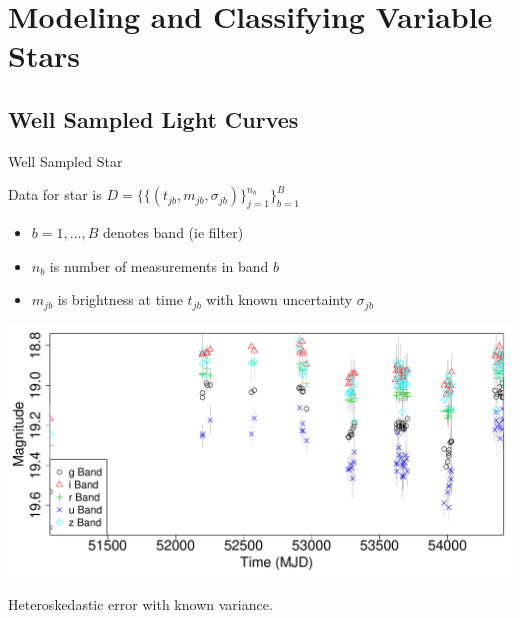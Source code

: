 \documentclass[12pt]{beamer}
\begin{document}
\section{Modeling and Classifying Variable Stars}

\subsection{Well Sampled Light Curves}

\begin{frame}{Well Sampled Star}

  Data for star is $D=\{\{(t_{jb},m_{jb},\sigma_{jb})\}_{j=1}^{n_b}\}_{b=1}^B$
\begin{itemize}
\item $b=1,\ldots,B$ denotes band (ie filter)
\item $n_b$ is number of measurements in band $b$
\item $m_{jb}$ is brightness at time $t_{jb}$ with known uncertainty $\sigma_{jb}$
\end{itemize}

\begin{center}
\includegraphics[scale=0.3]{figs/unfolded_7904669.pdf}
\end{center}

\begin{center}
  Heteroskedastic error with known variance.
\end{center}

\end{frame}
\end{document}
